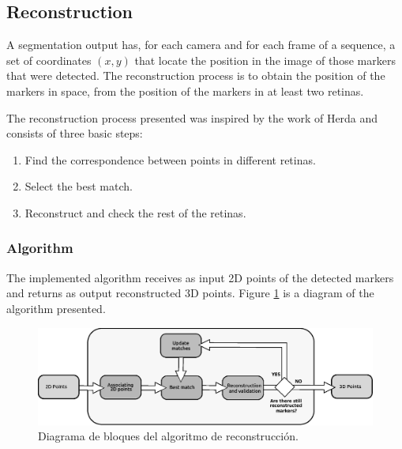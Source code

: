 \subsection{Reconstruction}
A segmentation output has, for each camera and for each frame of a sequence, a set of coordinates $(x, y)$ that locate the position in the image of those markers that were detected.
The reconstruction process is to obtain the position of the markers in space, from the position of the markers in at least two retinas.

The reconstruction process presented was inspired by the work of Herda and consists of three basic steps:
\vspace{-0.2cm}
\begin{enumerate}
\item Find the correspondence between points in different retinas.
\item Select the best match.
\item Reconstruct and check the rest of the retinas.
\end{enumerate}
\vspace{-0.8cm}
\subsubsection{Algorithm}
The implemented algorithm receives as input 2D points of the detected markers and returns as output reconstructed 3D points.
Figure \ref{fig: diagrama algoritmo} is a diagram of the algorithm presented.
\begin{figure}
    \begin{center}
        \includegraphics[scale=0.45]{./imagenes/Reconstruccion/bloques_reconstruccion}
        \caption{Diagrama de bloques del algoritmo de reconstrucción.}
        \label{fig: diagrama algoritmo}
    \end{center}
\end{figure}


